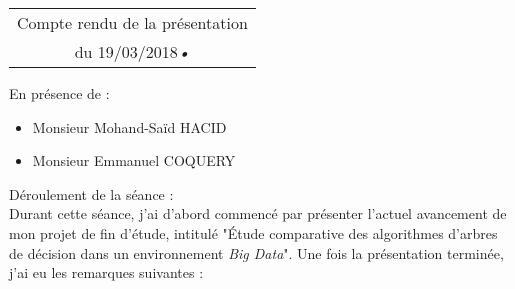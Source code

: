 \documentclass[a4paper, 11pt]{report}
\begin{document}
 
\begin{center}
\begin{tabular}{|c|}
\hline
Compte rendu de la présentation\\du 19\//03\//2018\textsl{•}\\
\hline

\end{tabular}
\end{center}


En présence de :\\
\begin{itemize}
\item Monsieur Mohand-Saïd HACID
\item Monsieur Emmanuel COQUERY
\end{itemize}


Déroulement de la séance :\\
Durant cette séance, j'ai d'abord commencé par présenter l'actuel avancement de mon projet de fin d'étude, intitulé "Étude comparative des algorithmes d'arbres de décision dans un environnement \emph{Big Data}". Une fois la présentation terminée, j'ai eu les remarques suivantes : \\
\end{document}

